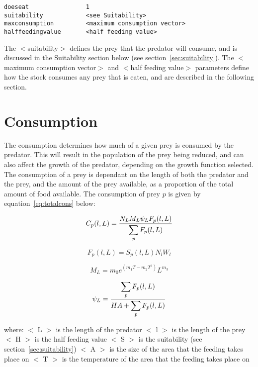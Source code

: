 \documentclass [a4paper, 10pt]{book}
\begin{document}
{\small\begin{verbatim}
doeseat                1
suitability            <see Suitability>
maxconsumption         <maximum consumption vector>
halffeedingvalue       <half feeding value>
\end{verbatim}}

The $<$suitability$>$ defines the prey that the predator will consume, and is discussed in the Suitability section below (see section~\ref{sec:suitability}).  The $<$maximum consumption vector$>$ and $<$half feeding value$>$ parameters define how the stock consumes any prey that is eaten, and are described in the following section.

\section{Consumption}\label{sec:consumption}
The consumption determines how much of a given prey is consumed by the predator.  This will result in the population of the prey being reduced, and can also affect the growth of the predator, depending on the growth function selected.  The consumption of a prey is dependant on the length of both the predator and the prey, and the amount of the prey available, as a proportion of the total amount of food available.  The consumption of prey $p$ is given by equation~\ref{eq:totalcons} below:

\begin{equation}\label{eq:totalcons}
C_{p}(l, L) = \frac{N_{L} M_{L} \psi_{L} F_{p}(l, L)}{\displaystyle \sum_{\it p} F_{p}(l, L)}
\end{equation}

\begin{equation}\label{eq:preycons}
F_{p}(l, L) = S_{p}(l, L) N_{l} W_{l}
\end{equation}

\begin{equation}\label{eq:maxcons}
M_{L} = m_{0} e^{(m_{1}T - m_{2}T^3)} L^{m_{3}}
\end{equation}

\begin{equation}\label{eq:feedlevel}
\psi_{L} = \frac{\displaystyle \sum_{\it p} F_{p}(l, L)}{H A + \displaystyle \sum_{\it p} F_{p}(l, L)}
\end{equation}

where:\newline
$<$ L $>$ is the length of the predator\newline
$<$ l $>$ is the length of the prey\newline
$<$ H $>$ is the half feeding value\newline
$<$ S $>$ is the suitability (see section~\ref{sec:suitability})\newline
$<$ A $>$ is the size of the area that the feeding takes place on\newline
$<$ T $>$ is the temperature of the area that the feeding takes place on
\end{document}
